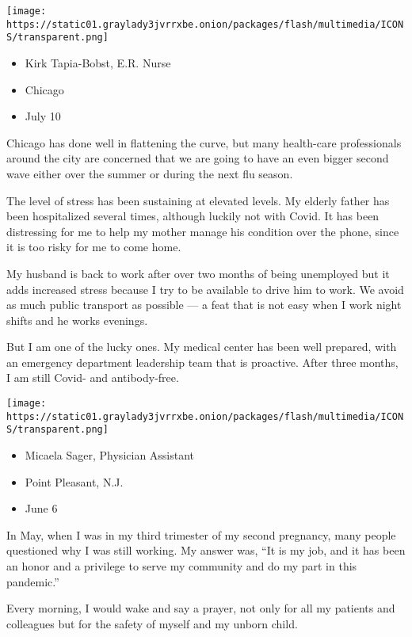 \texttt{[image: https://static01.graylady3jvrrxbe.onion/packages/flash/multimedia/ICONS/transparent.png]}

\begin{itemize}
\tightlist
\item
  Kirk Tapia-Bobst, E.R. Nurse
\item
  Chicago
\item
  July 10
\end{itemize}

Chicago has done well in flattening the curve, but many health-care
professionals around the city are concerned that we are going to have an
even bigger second wave either over the summer or during the next flu
season.

The level of stress has been sustaining at elevated levels. My elderly
father has been hospitalized several times, although luckily not with
Covid. It has been distressing for me to help my mother manage his
condition over the phone, since it is too risky for me to come home.

My husband is back to work after over two months of being unemployed but
it adds increased stress because I try to be available to drive him to
work. We avoid as much public transport as possible --- a feat that is
not easy when I work night shifts and he works evenings.

But I am one of the lucky ones. My medical center has been well
prepared, with an emergency department leadership team that is
proactive. After three months, I am still Covid- and antibody-free.

\texttt{[image: https://static01.graylady3jvrrxbe.onion/packages/flash/multimedia/ICONS/transparent.png]}

\begin{itemize}
\tightlist
\item
  Micaela Sager, Physician Assistant
\item
  Point Pleasant, N.J.
\item
  June 6
\end{itemize}

In May, when I was in my third trimester of my second pregnancy, many
people questioned why I was still working. My answer was, ``It is my
job, and it has been an honor and a privilege to serve my community and
do my part in this pandemic.''

Every morning, I would wake and say a prayer, not only for all my
patients and colleagues but for the safety of myself and my unborn
child.

